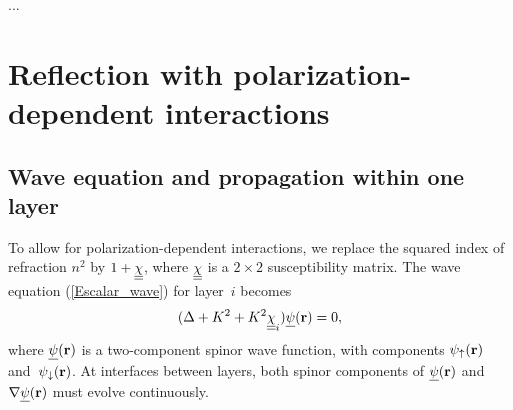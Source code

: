 ...



\section{Reflection with polarization-dependent interactions}\label{s:pol}


\subsection{Wave equation and propagation within one layer}

To allow for polarization-dependent interactions,
we replace the squared index of refraction $n^2$
by $1+\underline{\underline{\chi}}$, where $\underline{\underline{\chi}}$ is a $2\times 2$ susceptibility matrix.
The wave equation (\ref{Escalar_wave}) for layer~$i$ becomes
\begin{equation}\label{Ewaveqp}  
(\Delta +K^2 +K^2 \underline{\underline{\chi}}_i) \underline{\psi}(\mathbf{r})= 0,
\end{equation}
where $\underline{\psi}(\mathbf{r})$ is a two-component spinor wave function,
with components $\psi_\uparrow(\mathbf{r})$ and~$\psi_\downarrow(\mathbf{r})$.
At interfaces between layers,
both spinor components of $\underline{\psi}(\mathbf{r})$ and $\mathbf{\nabla}\underline{\psi}(\mathbf{r})$
must evolve continuously.


